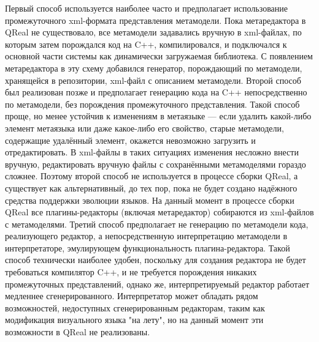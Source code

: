 \documentclass[a4paper]{article}
\begin{document}
Первый способ используется наиболее часто и предполагает использование промежуточного xml-формата представления метамодели. Пока метаредактора в QReal не существовало, все метамодели задавались вручную в xml-файлах, по которым затем порождался код на C++, компилировался, и подключался к основной части системы как динамически загружаемая библиотека. С появлением метаредактора в эту схему добавился генератор, порождающий по метамодели, хранящейся в репозитории, xml-файл с описанием метамодели. Второй способ был реализован позже и предполагает генерацию кода на C++ непосредственно по метамодели, без порождения промежуточного представления. Такой способ проще, но менее устойчив к изменениям в метаязыке --- если удалить какой-либо элемент метаязыка или даже какое-либо его свойство, старые метамодели, содержащие удалённый элемент, окажется невозможно загрузить и отредактировать. В xml-файлы в таких ситуациях изменения несложно внести вручную, редактировать вручную файлы с сохранёнными метамоделями гораздо сложнее. Поэтому второй способ не используется в процессе сборки QReal, а существует как альтернативный, до тех пор, пока не будет создано надёжного средства поддержки эволюции языков. На данный момент в процессе сборки QReal все плагины-редакторы (включая метаредактор) собираются из xml-файлов с метамоделями. Третий способ предполагает не генерацию по метамодели кода, реализующего редактор, а непосредственную интерпретацию метамодели в интерпретаторе, эмулирующем функциональность плагина-редактора. Такой способ технически наиболее удобен, поскольку для создания редактора не будет требоваться компилятор C++, и не требуется порождения никаких промежуточных представлений, однако же, интерпретируемый редактор работает медленнее сгенерированного. Интерпретатор может обладать рядом возможностей, недоступных сгенерированным редакторам, таким как модификация визуального языка "на лету", но на данный момент эти возможности в QReal не реализованы.
\end{document}
